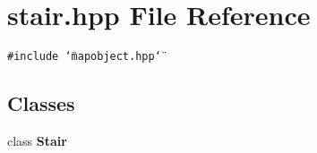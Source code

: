\section{stair.hpp File Reference}
\label{stair_8hpp}
{\tt \#include \char`\"{}mapobject.hpp\char`\"{}}\par
\subsection*{Classes}
\begin{CompactItemize}
\item 
class {\bf Stair}
\end{CompactItemize}
